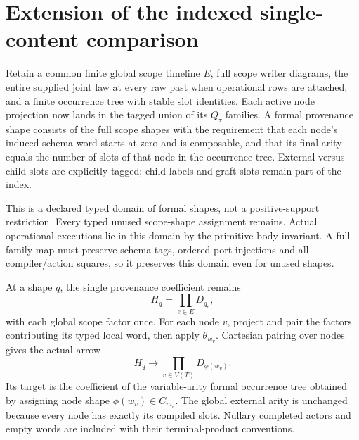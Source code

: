 \documentclass[11pt]{article}
\begin{document}
\section{Extension of the indexed single-content comparison}
Retain a common finite global scope timeline $E$, full scope writer diagrams, the entire supplied joint law at every raw past when operational rows are attached, and a finite occurrence tree with stable slot identities. Each active node projection now lands in the tagged union of its $Q_\tau$ families. A formal provenance shape consists of the full scope shapes with the requirement that each node's induced schema word starts at zero and is composable, and that its final arity equals the number of slots of that node in the occurrence tree. External versus child slots are explicitly tagged; child labels and graft slots remain part of the index.

This is a declared typed domain of formal shapes, not a positive-support restriction. Every typed unused scope-shape assignment remains. Actual operational executions lie in this domain by the primitive body invariant. A full family map must preserve schema tags, ordered port injections and all compiler/action squares, so it preserves this domain even for unused shapes.

At a shape $q$, the single provenance coefficient remains
\[
 H_q=\prod_{e\in E}D_{q_e},
\]
with each global scope factor once. For each node $v$, project and pair the factors contributing its typed local word, then apply $\theta_{w_v}$. Cartesian pairing over nodes gives the actual arrow
\[
 H_q\longrightarrow\prod_{v\in V(T)}D_{\phi(w_v)}.
\]
Its target is the coefficient of the variable-arity formal occurrence tree obtained by assigning node shape $\phi(w_v)\in C_{m_v}$. The global external arity is unchanged because every node has exactly its compiled slots. Nullary completed actors and empty words are included with their terminal-product conventions.
\end{document}
